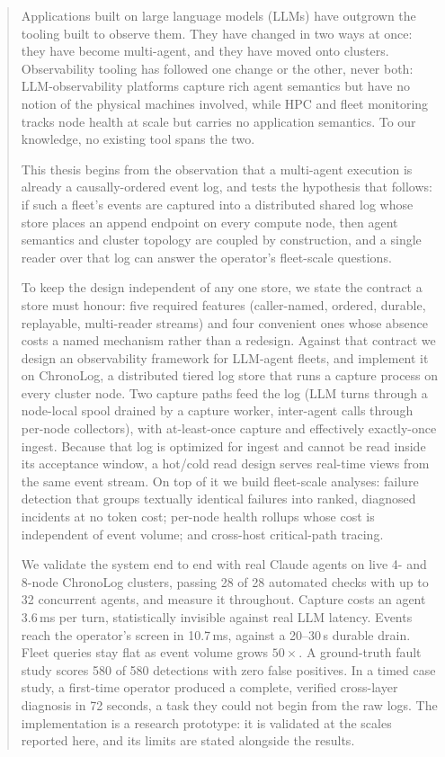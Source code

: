 \documentclass[11pt,a4paper]{report}
\begin{document}
\begin{abstract}
Applications built on large language models (LLMs) have outgrown the tooling
built to observe them. They have changed in two ways at once: they have
become multi-agent, and they have moved onto clusters.
Observability tooling has followed one change or the other, never both:
LLM-observability platforms capture rich agent semantics but have no notion
of the physical machines involved, while HPC and fleet monitoring tracks
node health at scale but carries no application semantics. To our
knowledge, no existing tool spans the two.

This thesis begins from the observation that a multi-agent execution is
already a causally-ordered event log, and tests the hypothesis that follows:
if such a fleet's events are captured into a distributed shared log whose
store places an append endpoint on every compute node, then agent semantics
and cluster topology are coupled by construction, and a single reader over
that log can answer the operator's fleet-scale questions.

To keep the design independent of any one store, we state the contract a
store must honour: five required features (caller-named, ordered, durable,
replayable, multi-reader streams) and four convenient ones whose absence
costs a named mechanism rather than a redesign. Against that contract we
design an observability framework for LLM-agent fleets, and implement
it on ChronoLog, a distributed tiered log store that runs a capture process
on every cluster node. Two capture paths feed the log (LLM turns through
a node-local spool drained by a capture worker, inter-agent calls through
per-node collectors), with at-least-once capture and effectively
exactly-once ingest. Because that log is optimized for ingest and cannot be
read inside its acceptance window, a hot/cold read design serves real-time
views from the same event stream. On top of it we build fleet-scale
analyses: failure detection that groups textually identical failures into
ranked, diagnosed incidents at no token cost; per-node health rollups whose
cost is independent of event volume; and cross-host critical-path tracing.

We validate the system end to end with real Claude agents on live 4- and
8-node ChronoLog clusters, passing 28 of 28 automated checks with up to 32
concurrent agents, and measure it throughout. Capture costs an agent
3.6\,ms per turn, statistically invisible against real LLM latency. Events
reach the operator's screen in 10.7\,ms, against a 20--30\,s durable drain.
Fleet queries stay flat as event volume grows $50\times$. A ground-truth
fault study scores 580 of 580 detections with zero false positives. In a
timed case study, a first-time operator produced a complete, verified
cross-layer diagnosis in 72 seconds, a task they could not begin from the
raw logs. The implementation is a research prototype: it is validated at
the scales reported here, and its limits are stated alongside the results.
\end{abstract}
\end{document}
